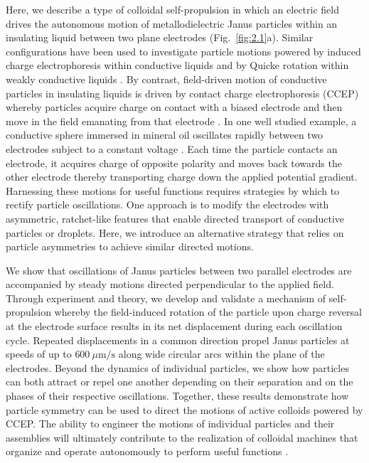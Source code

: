 Here, we describe a type of colloidal self-propulsion in which an electric field drives the autonomous motion of metallodielectric Janus particles\autocite{Perro2005,Pawar2008} within an insulating liquid between two plane electrodes (Fig.~\ref{fig:2.1}a).
Similar configurations have been used to investigate particle motions powered by induced charge electrophoresis within conductive liquids\autocite{Boymelgreen2014} and by Quicke rotation within weakly conductive liquids \autocite{Bricard2013}.
By contrast, field-driven  motion of conductive particles in insulating liquids is driven by contact charge electrophoresis (CCEP) whereby particles acquire charge on contact with a biased electrode and then move in the field emanating from that electrode \autocite{drews2013ratcheted,cartier2014microfluidic,drews2015contact}.
In one well studied example, a conductive sphere immersed in mineral oil oscillates rapidly between two electrodes subject to a constant voltage \autocite{drews2015contact}.
Each time the particle contacts an electrode, it acquires charge of opposite polarity and moves back towards the other electrode thereby transporting charge down the applied potential gradient.
Harnessing these motions for useful functions requires strategies by which to rectify particle oscillations.
One approach is to modify the electrodes with asymmetric, ratchet-like features that enable directed transport of conductive particles\autocite{drews2013ratcheted} or droplets\autocite{Um2016}.
Here, we introduce an alternative strategy that relies on particle asymmetries to achieve similar directed motions.

We show that oscillations of Janus particles between two parallel electrodes are accompanied by steady motions directed perpendicular to the applied field.
Through experiment and theory, we develop and validate a mechanism of self-propulsion whereby the field-induced rotation of the particle upon charge reversal at the electrode surface results in its net displacement during each oscillation cycle.
Repeated displacements in a common direction propel Janus particles at speeds of up to $600~\mu\text{m/s}$ along wide circular arcs within the plane of the electrodes.
Beyond the dynamics of individual particles, we show how particles can both attract or repel one another depending on their separation and on the phases of their respective oscillations.
Together, these results demonstrate how particle symmetry can be used to direct the motions of active colloids powered by CCEP.
The ability to engineer the motions of individual particles and their assemblies will ultimately contribute to the realization of colloidal machines that organize and operate autonomously to perform useful functions \autocite{Spellings2015}.

